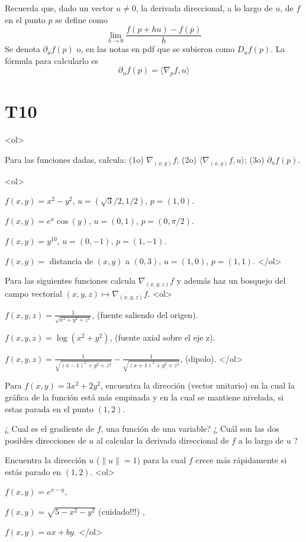 \documentclass{article}
\theoremstyle{definition}
\begin{document}
Recuerda que, dado un vector $u\ne 0$, la derivada direccional, a lo largo de $u$, de $f$
en el punto $p$ se define como
$$
\lim_{h \to 0} \frac{f(p+hu)-f(p)}{h}
$$
Se denota $\partial_uf(p)$ o, en las notas en pdf que
se subieron como  $D_uf(p)$. La fórmula para calcularlo es
$$
\partial_uf(p)= \langle \nabla_pf, u \rangle 
$$

\section*{T10 }

<ol>
\item Para las funciones dadas, calcula: (1o) $\nabla_{(x,y)}f$;
  (2o) $\langle \nabla_{(x,y)} f, u \rangle$;
  (3o) $\partial_{u}f(p)$.

  <ol>
  \item $f(x,y)=x^2-y^2$, $u=(\sqrt{3}/2,1/2)$, $p=(1,0)$.
  \item $f(x,y)=e^x\cos(y)$, $u=(0,1)$, $p=(0,\pi/2)$.
  \item $f(x,y)=y^{10}$, $u=(0,-1)$, $p=(1,-1)$.
    \item $f(x,y)=$ distancia de $(x,y)$ a $(0,3)$, $u=(1,0)$, $p=(1,1)$.
  </ol>

\item Para las siguientes funciones calcula $\nabla_{(x,y,z)}f$ y además haz un bosquejo
  del campo vectorial $(x,y,z)\mapsto \nabla_{(x,y,z)}f$.
  <ol>
  \item $f(x,y,z)=\frac{1}{\sqrt{x^2+y^2+z^2}}$, (fuente saliendo del origen).
  \item $f(x,y,z)=\log(x^2+y^2)$, (fuente axial sobre el eje z).
  \item $f(x,y,z)=\frac{1}{\sqrt{(x-1)^2+y^2+z^2}}-\frac{1}{\sqrt{(x+1)^2+y^2+z^2}}$, (dipolo). 
  </ol>

\item Para $f(x,y)=3x^2+2y^2$, encuentra la dirección (vector unitario) en la cual la gráfica
  de la función está más empinada  y en la cual se mantiene nivelada, si estas parada
  en el punto $(1,2)$.
  
\item ¿ Cual es el gradiente de $f$,
  una función de una variable?
  ¿ Cuál son las dos posibles direcciones de $u$ al calcular
  la derivada direccional de $f$ a lo largo de $u$ ?

\item Encuentra la dirección $u$ ($\|u\|=1$) para la cual $f$ crece más rápidamente
  si estás parado en $(1,2)$.
  <ol>
  \item $f(x,y)=e^{x-y}$,
  \item $f(x,y)=\sqrt{5-x^2-y^2}$ (cuidado!!!) ,
  \item $f(x,y)=ax+by$.
  </ol>
\end{document}
